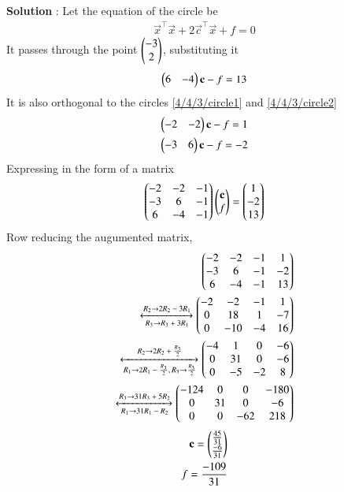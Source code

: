 \textbf{Solution} : Let the equation of the circle be
\begin{align}
    \vec{x}^\top\vec{x} + 2\vec{c}^\top\vec{x} + f = 0
\end{align}
It passes through the point $\begin{pmatrix}-3\\2\end{pmatrix}$, substituting it
\begin{align}
    \begin{pmatrix}6&-4\end{pmatrix}\mathbf{c} - f = 13  
\end{align}
It is also orthogonal to the circles \eqref{4/4/3/circle1} and \eqref{4/4/3/circle2}
\begin{align}
    \begin{pmatrix}-2&-2\end{pmatrix}\mathbf{c} - f = 1\\
    \begin{pmatrix}-3&6\end{pmatrix}\mathbf{c} - f = -2
\end{align}
Expressing in the form of a matrix
\begin{align}
    \begin{pmatrix}-2&-2&-1\\-3&6&-1\\6&-4&-1\end{pmatrix}\begin{pmatrix}\mathbf{c}\\f\end{pmatrix} = \begin{pmatrix}1\\-2\\13\end{pmatrix}
\end{align}
Row reducing the augumented matrix,
\begin{align}
    \begin{pmatrix}-2&-2&-1&1\\-3&6&-1&-2\\6&-4&-1&13\end{pmatrix} \\ \xleftrightarrow[\text{$R_3$}\rightarrow{\text{$R_3 + 3R_1$}}] {\text{$R_2$}\rightarrow{\text{$2R_2 - 3R_1$}}} \begin{pmatrix}-2&-2&-1&1\\0&18&1&-7\\0&-10&-4&16\end{pmatrix}\\
    \xleftrightarrow[\text{$R_1$}\rightarrow{\text{$2R_1 - \frac{R_3}{2}$}} \text{$,R_3$}\rightarrow{\text{$\frac{R_3}{2}$}} ] {\text{$R_2$}\rightarrow{\text{$2R_2 + \frac{R_3}{2}$}}} \begin{pmatrix}-4&1&0&-6\\0&31&0&-6\\0&-5&-2&8\end{pmatrix}\\
    \xleftrightarrow[\text{$R_1$}\rightarrow{\text{$31R_1 - R_2$}}] {\text{$R_3$}\rightarrow{\text{$31R_3 + 5R_2$}}} \begin{pmatrix}-124&0&0&-180\\0&31&0&-6\\0&0&-62&218\end{pmatrix}
\end{align}
\begin{align}
    \mathbf{c} = \begin{pmatrix}\frac{45}{31}\\\frac{-6}{31}\end{pmatrix}\\
    f = \frac{-109}{31}
\end{align}
